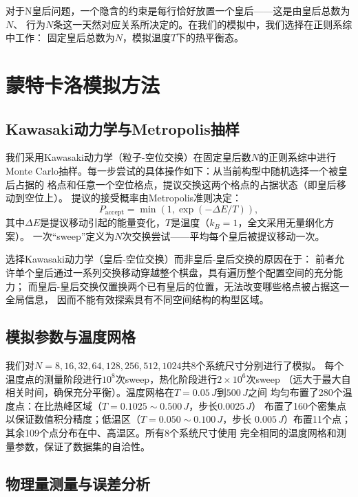 对于N皇后问题，一个隐含的约束是每行恰好放置一个皇后——这是由皇后总数为$N$、
行为$N$条这一天然对应关系所决定的。在我们的模拟中，我们选择在正则系综中工作：
固定皇后总数为$N$，模拟温度$T$下的热平衡态。

\section{蒙特卡洛模拟方法}

\subsection{Kawasaki动力学与Metropolis抽样}

我们采用Kawasaki动力学（粒子-空位交换）在固定皇后数$N$的正则系综中进行
Monte Carlo抽样。每一步尝试的具体操作如下：从当前构型中随机选择一个被皇后占据的
格点和任意一个空位格点，提议交换这两个格点的占据状态（即皇后移动到空位上）。
提议的接受概率由Metropolis准则决定：
%
\begin{equation}
  P_{\text{accept}} = \min\left(1, \exp\left(-\Delta E / T\right)\right),
  \label{eq:metropolis}
\end{equation}
%
其中$\Delta E$是提议移动引起的能量变化，$T$是温度（$k_{B}=1$，全文采用无量纲化方案）。
一次``sweep''定义为$N$次交换尝试——平均每个皇后被提议移动一次。

选择Kawasaki动力学（皇后-空位交换）而非皇后-皇后交换的原因在于：
前者允许单个皇后通过一系列交换移动穿越整个棋盘，具有遍历整个配置空间的充分能力；
而皇后-皇后交换仅置换两个已有皇后的位置，无法改变哪些格点被占据这一全局信息，
因而不能有效探索具有不同空间结构的构型区域。

\subsection{模拟参数与温度网格}

我们对$N=8,16,32,64,128,256,512,1024$共8个系统尺寸分别进行了模拟。
每个温度点的测量阶段进行$10^{8}$次sweep，热化阶段进行$2\times10^{6}$次sweep
（远大于最大自相关时间，确保充分平衡）。温度网格在$T=0.05\,J$到$500\,J$之间
均匀布置了280个温度点：在比热峰区域（$T=0.1025\sim0.500\,J$，步长$0.0025\,J$）
布置了160个密集点以保证数值积分精度；低温区（$T=0.050\sim0.100\,J$，步长
$0.005\,J$）布置11个点；其余109个点分布在中、高温区。所有8个系统尺寸使用
完全相同的温度网格和测量参数，保证了数据集的自洽性。

\subsection{物理量测量与误差分析}

